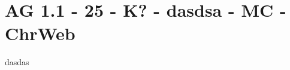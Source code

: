 \section{AG 1.1 - 25 - K? - dasdsa - MC - ChrWeb}

\begin{beispiel}[AG 1.1]{1}
dasdas
\end{beispiel}
